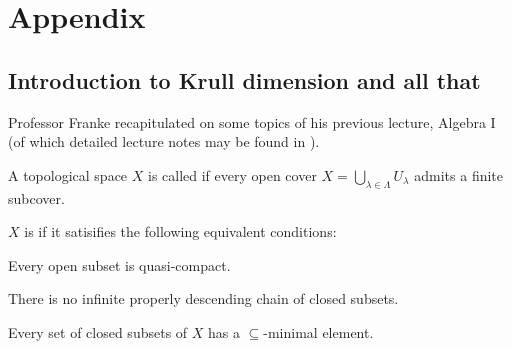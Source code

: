\documentclass[a4paper,parskip=half,numbers=enddot, DIV=12]{scrreprt}
\begin{document}
\appendix
\chapter{Appendix}
\setcounter{thm}{0}
\renewcommand*{\thethm}{\Alph{thm}}
\section{Introduction to Krull dimension and all that}
Professor Franke recapitulated on some topics of his previous lecture, Algebra I (of which detailed lecture notes may be found in \cite{alg1}).
\begin{defi}
	A topological space $X$ is called  if every open cover $X = \bigcup_{\lambda\in\Lambda} U_\lambda$ admits a finite subcover.
	
	$X$ is  if it satisifies the following equivalent conditions:
	\begin{alphanumerate}
		\item Every open subset is quasi-compact.
		\item There is no infinite properly descending chain of closed subsets.
		\item Every set of closed subsets of $X$ has a $\subseteq$-minimal element.
	\end{alphanumerate}
\end{defi}
\end{document}
